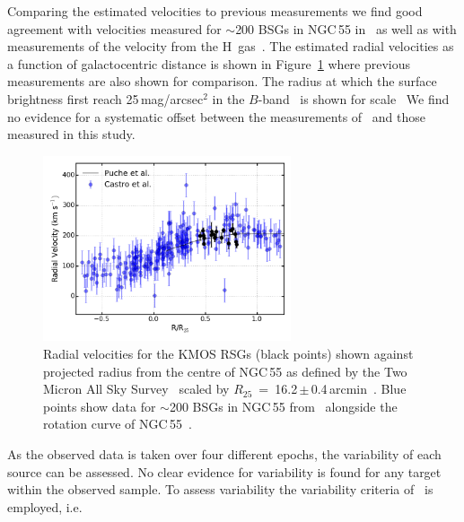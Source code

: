 Comparing the estimated velocities to previous measurements we find good agreement with velocities measured for $\sim$200 BSGs in NGC\,55 in~\citep{2008A&A...485...41C} as well as with measurements of the velocity from the H\,\1 gas~\citep{1991AJ....101..447P}.
The estimated radial velocities as a function of galactocentric distance is shown in Figure~\ref{fig:RvsRV} where previous measurements are also shown for comparison.
The radius at which the surface brightness first reach 25\,mag/arcsec$^2$ in the $B$-band~\citep[R$_{25}$ e.g.][]{2015eaci.book.....S} is shown for scale~\citep[$R_{25}$~=~16.2\,$\pm$\,0.4\,arcmin][]{1991rc3..book.....D}
We find no evidence for a systematic offset between the measurements of~\cite{2008A&A...485...41C} and those measured in this study.

\begin{figure}
 \centering
 \includegraphics[width=0.65\textwidth]{ngc55/NGC55-RvsRV}
 \caption[Radial velocities for KMOS targets shown against projected radius]{
 Radial velocities for the KMOS RSGs (black points) shown against projected radius from the centre of NGC\,55 as defined by the Two Micron All Sky Survey~\citep[2MASS;][]{2006AJ....131.1163S} scaled by $R_{25}$~=~16.2\,$\pm$\,0.4\,arcmin~\citep{1991rc3..book.....D}.
Blue points show data for $\sim$200 BSGs in NGC\,55 from~\citep[][; shown with 50\% transparency to highlight densely populated areas]{2008A&A...485...41C} alongside the rotation curve of NGC\,55~\citep[black solid line;][]{1991AJ....101..447P}.}
 \label{fig:RvsRV}
\end{figure}

As the observed data is taken over four different epochs, the variability of each source can be assessed. No clear evidence for variability is found for any target within the observed sample.
To assess variability the variability criteria of~\citep{2012A&A...546A..73H} is employed, i.e.

